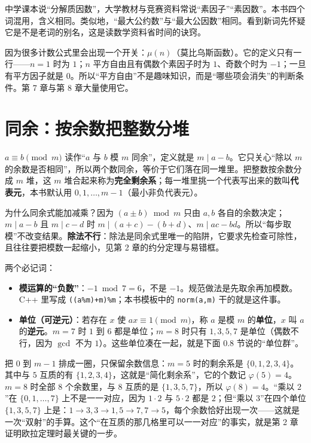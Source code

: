 \documentclass[UTF8,a4paper,11pt,twoside,openright,fontset=fandol]{ctexbook}
\theoremstyle{definition}
\begin{document}
\begin{tip}
中学课本说“分解质因数”，大学教材与竞赛资料常说“素因子”“素因数”。本书四个词混用，含义相同。类似地，“最大公约数”与“最大公因数”相同。看到新词先怀疑它是不是老词的别名，这是读数学资料省时间的诀窍。
\end{tip}

\begin{tip}
因为很多计数公式里会出现一个开关：$\mu(n)$（莫比乌斯函数）。它的定义只有一行——$n=1$ 时为 $1$；$n$ 平方自由且有偶数个素因子时为 $1$、奇数个时为 $-1$；一旦有平方因子就是 $0$。所以“平方自由”不是趣味知识，而是“哪些项会消失”的判断条件。第 7 章与第 8 章大量使用它。
\end{tip}

\section{同余：按余数把整数分堆}
$a\equiv b\pmod m$ 读作“$a$ 与 $b$ 模 $m$ 同余”，定义就是 $m\mid a-b$。它只关心“除以 $m$ 的余数是否相同”，所以两个数同余，等价于它们落在同一堆里。把整数按余数分成 $m$ 堆，这 $m$ 堆合起来称为\textbf{完全剩余系}；每一堆里挑一个代表写出来的数叫\textbf{代表元}，本书默认用 $0,1,\ldots,m-1$（最小非负代表元）。

为什么同余式能加减乘？因为 $(a\pm b)\bmod m$ 只由 $a,b$ 各自的余数决定；$m\mid a-b$ 且 $m\mid c-d$ 时 $m\mid(a+c)-(b+d)$、$m\mid ac-bd$。所以“每步取模”不改变结果。\textbf{除法不行}：除法是同余式里唯一的陷阱，它要求先检查可除性，且往往要把模数一起缩小，见第 2 章的约分定理与易错框。

两个必记词：
\begin{itemize}
\item \textbf{模运算的“负数”}：$-1\bmod 7=6$，不是 $-1$。规范做法是先取余再加模数。C++ 里写成 \texttt{((a\%m)+m)\%m}；本书模板中的 \texttt{norm(a,m)} 干的就是这件事。
\item \textbf{单位（可逆元）}：若存在 $x$ 使 $ax\equiv1\pmod m$，称 $a$ 是模 $m$ 的\textbf{单位}，$x$ 叫 $a$ 的\textbf{逆元}。$m=7$ 时 $1$ 到 $6$ 都是单位；$m=8$ 时只有 $1,3,5,7$ 是单位（偶数不行，因为 $\gcd$ 不为 $1$）。这些单位凑在一起，就是下面 0.8 节说的“单位群”。
\end{itemize}

\begin{tip}
把 $0$ 到 $m-1$ 排成一圈，只保留余数信息：$m=5$ 时的剩余系是 $\{0,1,2,3,4\}$。其中与 $5$ 互质的有 $\{1,2,3,4\}$，这就是“简化剩余系”，它的个数记 $\varphi(5)=4$。$m=8$ 时全部 $8$ 个余数里，与 $8$ 互质的是 $\{1,3,5,7\}$，所以 $\varphi(8)=4$。“乘以 $2$”在 $\{0,1,\ldots,7\}$ 上不是一一对应，因为 $1\cdot2$ 与 $5\cdot2$ 都是 $2$；但“乘以 $3$”在四个单位 $\{1,3,5,7\}$ 上是：$1\to3,3\to1,5\to7,7\to5$，每个余数恰好出现一次——这就是一次“双射”的手算。这个“在互质的那几格里可以一一对应”的事实，就是第 2 章证明欧拉定理时最关键的一步。
\end{tip}
\end{document}
